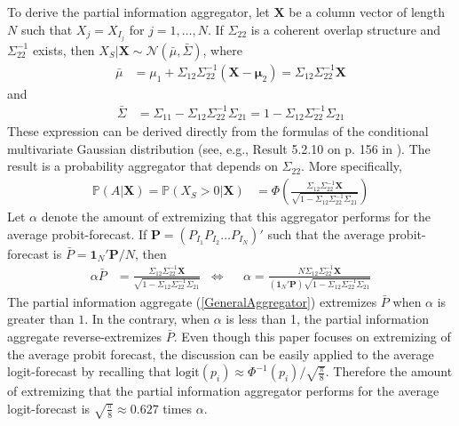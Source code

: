 \documentclass[11pt]{article}
\renewcommand{\P}{\mathbb{P}}
\theoremstyle{definition}
\theoremstyle{definition}
\begin{document}
To derive the partial information aggregator, let $\boldsymbol{X}$ be a column vector of length $N$ such that $X_j = X_{I_j}$ for $j = 1, \dots, N$. If $\Sigma_{22}$ is a coherent overlap structure and $\Sigma_{22}^{-1}$ exists, then $X_{S} | \boldsymbol{X} \sim \mathcal{N}(\bar{\mu}, \bar{\Sigma})$, where
\begin{align}
\bar{\mu} &= \mu_1 + \Sigma_{12} \Sigma_{22}^{-1} (\boldsymbol{X} - \boldsymbol{\mu}_2) =  \Sigma_{12} \Sigma_{22}^{-1} \boldsymbol{X} \label{condMu}
\end{align}
and
\begin{align}
 \bar{\Sigma}&= \Sigma_{11} - \Sigma_{12} \Sigma_{22}^{-1} \Sigma_{21} =1 - \Sigma_{12} \Sigma_{22}^{-1} \Sigma_{21}  \label{condSigma}
\end{align}
These expression can be derived directly from the formulas of the conditional multivariate Gaussian distribution (see, e.g., Result 5.2.10 on p. 156 in \cite{ravishanker2001first}). The result is a probability aggregator that depends on $\Sigma_{22}$. More specifically,
\begin{align}
\P\left(A  | \boldsymbol{X}\right)  = \P\left(X_{S} > 0 | \boldsymbol{X}\right) &= \Phi\left( \frac{\Sigma_{12} \Sigma_{22}^{-1} \boldsymbol{X}}{\sqrt{1 - \Sigma_{12} \Sigma_{22}^{-1} \Sigma_{21}}}\right) \label{GeneralAggregator}
\end{align}
Let $\alpha$ denote the amount of extremizing that this aggregator performs for the average probit-forecast. If $\boldsymbol{P} = (P_{I_1} P_{I_2} \dots P_{I_N})'$ such that the average probit-forecast is $\bar{P} = \boldsymbol{1}_N' \boldsymbol{P} /N$, then
\begin{align}
\alpha \bar{P}&=  \frac{\Sigma_{12} \Sigma_{22}^{-1} \boldsymbol{X}}{\sqrt{1 - \Sigma_{12} \Sigma_{22}^{-1} \Sigma_{21}}}  &\Leftrightarrow&& \alpha  = \frac{N \Sigma_{12} \Sigma_{22}^{-1} \boldsymbol{X}}{\left(\boldsymbol{1}_N' \boldsymbol{P} \right) \sqrt{1 - \Sigma_{12} \Sigma_{22}^{-1} \Sigma_{21}}} \label{alpha}
\end{align}
The partial information aggregate (\ref{GeneralAggregator}) extremizes $\bar{P}$ when $\alpha$ is greater than $1$. In the contrary, when $\alpha$ is less than 1, the partial information aggregate reverse-extremizes $\bar{P}$. Even though this paper focuses on extremizing of the average probit forecast, the discussion can be easily applied to the average logit-forecast by recalling that $\text{logit}(p_i) \approx \Phi^{-1}(p_i)/\sqrt{\frac{\pi}{8}}$. Therefore the amount of extremizing that the partial information aggregator performs for the average logit-forecast is $\sqrt{\frac{\pi}{8}} \approx 0.627$ times $\alpha$.  
\end{document}

